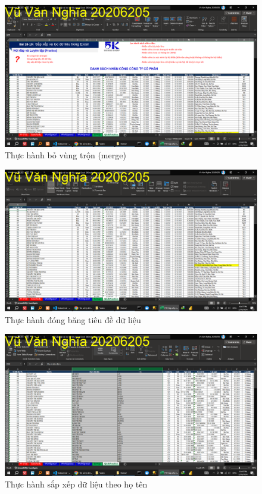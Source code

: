 \documentclass{article}
\begin{document}



\begin{figure}[h]
    \centering
    \includegraphics[scale = 0.15]{Video2/ThucHanh/0.png}
    \caption{Thực hành bỏ vùng trộn (merge)}
\end{figure}


\begin{figure}[h]
    \centering
    \includegraphics[scale = 0.15]{Video2/ThucHanh/1.png}
    \caption{Thực hành đóng băng tiêu đề dữ liệu}
\end{figure}




\begin{figure}[h]
    \centering
    \includegraphics[scale = 0.15]{Video2/ThucHanh/2.png}
    \caption{Thực hành sắp xếp dữ liệu theo họ tên}
\end{figure}
\end{document}
